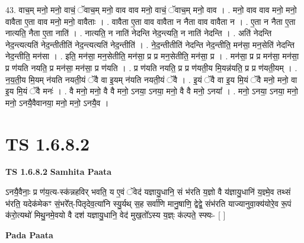 \documentclass[17pt]{extarticle}
\begin{document}
43. वाच॒म् मनो॒ मनो॒ वाचं॒ ॅवाच॒म् मनो॒ वाव वाव मनो॒ वाचं॒ ॅवाच॒म् मनो॒ वाव । . मनो॒ वाव वाव मनो॒ मनो॒ वावैता ए॒ता वाव मनो॒ मनो॒ वावैताः । . वावैता ए॒ता वाव वावैता न नैता वाव वावैता न । . ए॒ता न नैता ए॒ता नात्यति॒ नैता ए॒ता नाति॑ । . नात्यति॒ न नाति॑ नेदन्ति नेद॒न्त्यति॒ न नाति॑ नेदन्ति । . अति॑ नेदन्ति नेद॒न्त्यत्यति॑ नेद॒न्तीतीति॑ नेद॒न्त्यत्यति॑ नेद॒न्तीति॑ । . ने॒द॒न्तीतीति॑ नेदन्ति नेद॒न्तीति॒ मन॑सा॒ मन॒सेति॑ नेदन्ति नेद॒न्तीति॒ मन॑सा । . इति॒ मन॑सा॒ मन॒सेतीति॒ मन॑सा॒ प्र प्र मन॒सेतीति॒ मन॑सा॒ प्र । . मन॑सा॒ प्र प्र मन॑सा॒ मन॑सा॒ प्र ण॑यति नयति॒ प्र मन॑सा॒ मन॑सा॒ प्र ण॑यति । . प्र ण॑यति नयति॒ प्र प्र ण॑यती॒य मि॒यन्न॑यति॒ प्र प्र ण॑यती॒यम् । . न॒य॒ती॒य मि॒यम् न॑यति नयती॒यं ॅवै वा इ॒यम् न॑यति नयती॒यं ॅवै । . इ॒यं ॅवै वा इ॒य मि॒यं ॅवै मनो॒ मनो॒ वा इ॒य मि॒यं ॅवै मनः॑ । . वै मनो॒ मनो॒ वै वै मनो॒ ऽनया॒ ऽनया॒ मनो॒ वै वै मनो॒ ऽनया᳚ । . मनो॒ ऽनया॒ ऽनया॒ मनो॒ मनो॒ ऽनयै॒वैवानया॒ मनो॒ मनो॒ ऽनयै॒व । \newline
\pagebreak
{}

\section{ TS 1.6.8.2 }

\textbf{TS 1.6.8.2 } \newline
\textbf{Samhita Paata} \newline

ऽनयै॒वैनाः॒ प्र ण॑य॒त्य-स्क॑न्नहविर् भवति॒ य ए॒वं ॅवेद॑ यज्ञायु॒धानि॒ सं भ॑रति य॒ज्ञो वै य॑ज्ञायु॒धानि॑ य॒ज्ञ्मे॒व तथ्सं भ॑रति॒ यदेक॑मेकꣳ सं॒भरे᳚त्-पितृदेव॒त्या॑नि स्यु॒र्यथ् स॒ह सर्वा॑णि मानु॒षाणि॒ द्वेद्वे॒ संभ॑रति याज्यानुवा॒क्य॑योरे॒व रू॒पं क॑रो॒त्यथो॑ मिथु॒नमे॒वयो वै दश॑ यज्ञायु॒धानि॒ वेद॑ मुख॒तो᳚ऽस्य य॒ज्ञ्ः क॑ल्पते॒ स्फ्यः- [ ] \newline

\textbf{Pada Paata} \newline
\end{document}
